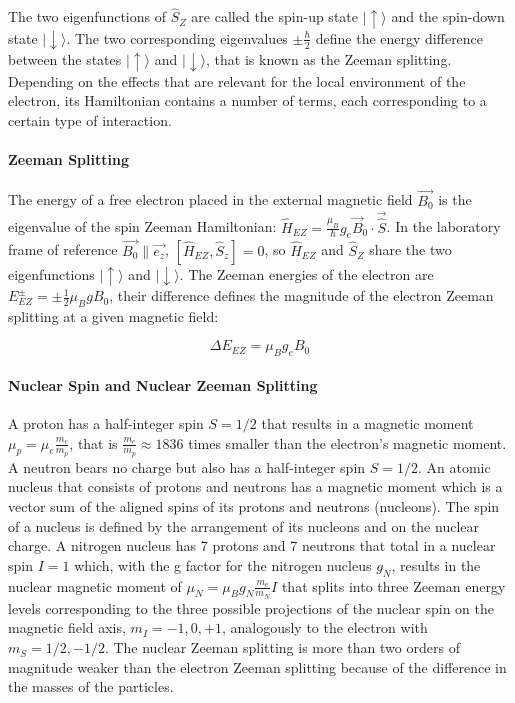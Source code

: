The two eigenfunctions of $\hat{S}_Z$ are called the spin-up state $\vert{\uparrow\rangle}$ and the spin-down state $\vert{\downarrow\rangle}$. The two corresponding eigenvalues $\pm\frac{\hbar}{2}$ define the energy difference between the states $\vert{\uparrow\rangle}$ and $\vert{\downarrow\rangle}$, that is known as the Zeeman splitting. Depending on the effects that are relevant for the local environment of the electron, its Hamiltonian contains a number of terms, each corresponding to a certain type of interaction.

\paragraph*{Zeeman Splitting}
The energy of a free electron placed in the external magnetic field $\vec{B_0}$ is the eigenvalue of the spin Zeeman Hamiltonian: $\hat{H}_{EZ} = \frac{\mu_B}{\hbar} g_e\vec{B}_0\cdot\vec{\hat{S}}$. In the laboratory frame of reference $\vec{B_0}\parallel\vec{e_z}$, $\left[\hat{H}_{EZ},\hat{S}_z\right]=0$, so $\hat{H}_{EZ}$ and $\hat{S}_Z$ share the two eigenfunctions $\vert{\uparrow\rangle}$ and $\vert{\downarrow\rangle}$. The Zeeman energies of the electron are $E_{EZ}^{\pm} = \pm \frac{1}{2}\mu_B g B_0$, their difference defines the magnitude of the electron Zeeman splitting at a given magnetic field:

\begin{equation}
\label{eq:epr_resonance_condition}
\Delta E_{EZ} = \mu_B g_e B_0
\end{equation}
 

\paragraph*{Nuclear Spin and Nuclear Zeeman Splitting}
A proton has a half-integer spin $S=1/2$ that results in a magnetic moment $\mu_p = \mu_e\frac{m_e}{m_p}$, that is $\frac{m_e}{m_p}\approx1836$ times smaller than the electron's magnetic moment. A neutron bears no charge but also has a half-integer spin $S=1/2$. An atomic nucleus that consists of protons and neutrons has a magnetic moment which is a vector sum of the aligned spins of its protons and neutrons (nucleons). The spin of a nucleus is defined by the arrangement of its nucleons and on the nuclear charge. A nitrogen nucleus has 7 protons and 7 neutrons that total in a nuclear spin $I=1$ which, with the g factor for the nitrogen nucleus $g_N$, results in the nuclear magnetic moment of $\mu_N=\mu_Bg_N\frac{m_e}{m_N}I$ that splits into three Zeeman energy levels corresponding to the three possible projections of the nuclear spin on the magnetic field axis, $m_I=-1,0,+1$, analogously to the electron with $m_S=1/2,-1/2$. The nuclear Zeeman splitting is more than two orders of magnitude weaker than the electron Zeeman splitting because of the difference in the masses of the particles.

